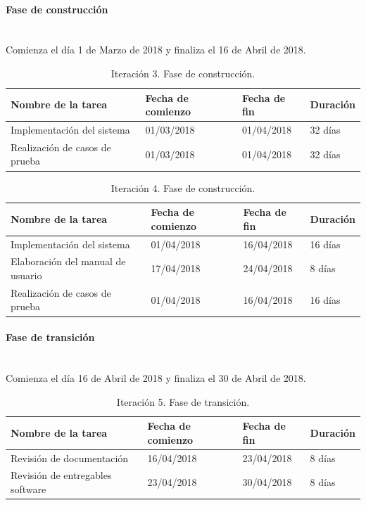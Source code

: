 \documentclass[twoside]{report}
\begin{document}
\paragraph{Fase de construcción}\mbox{}\\

Comienza el día 1 de Marzo de 2018 y finaliza el 16 de Abril de 2018.

\begin{table}[H]
\centering
\begin{tabular}{|l|l|l|l|}
\hline
Nombre de la tarea             & Fecha de comienzo & Fecha de fin & Duración \\ \hline
Implementación del sistema     & 01/03/2018        & 01/04/2018   & 32 días  \\ \hline
Realización de casos de prueba & 01/03/2018        & 01/04/2018   & 32 días  \\ \hline
\end{tabular}
\caption{Iteración 3. Fase de construcción.}
\end{table}

\begin{table}[H]
\centering
\begin{tabular}{|l|l|l|l|}
\hline
Nombre de la tarea                & Fecha de comienzo & Fecha de fin & Duración \\ \hline
Implementación del sistema        & 01/04/2018        & 16/04/2018   & 16 días  \\ \hline
Elaboración del manual de usuario & 17/04/2018        & 24/04/2018   & 8 días   \\ \hline
Realización de casos de prueba    & 01/04/2018        & 16/04/2018   & 16 días  \\ \hline
\end{tabular}
\caption{Iteración 4. Fase de construcción.}
\end{table}

\paragraph{Fase de transición}\mbox{}\\

Comienza el día 16 de Abril de 2018 y finaliza el 30 de Abril de 2018.

\begin{table}[H]
\centering
\begin{tabular}{|l|l|l|l|}
\hline
Nombre de la tarea              & Fecha de comienzo & Fecha de fin & Duración \\ \hline
Revisión de documentación       & 16/04/2018        & 23/04/2018   & 8 días   \\ \hline
Revisión de entregables software & 23/04/2018        & 30/04/2018   & 8 días   \\ \hline
\end{tabular}
\caption{Iteración 5. Fase de transición.}
\end{table}
\end{document}
